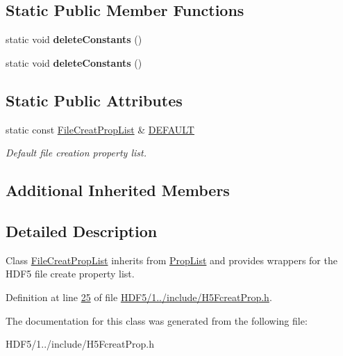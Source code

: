 \subsection*{Static Public Member Functions}
\begin{DoxyCompactItemize}
\item 
\mbox{\label{class_h5_1_1_file_creat_prop_list_acaf37fd4decdd710778cd89e2eff4d78}} 
static void {\bfseries delete\+Constants} ()
\item 
\mbox{\label{class_h5_1_1_file_creat_prop_list_acaf37fd4decdd710778cd89e2eff4d78}} 
static void {\bfseries delete\+Constants} ()
\end{DoxyCompactItemize}
\subsection*{Static Public Attributes}
\begin{DoxyCompactItemize}
\item 
\mbox{\label{class_h5_1_1_file_creat_prop_list_a4913710830a8ec38fbbda805074377d4}} 
static const \hyperlink{class_h5_1_1_file_creat_prop_list}{File\+Creat\+Prop\+List} \& \hyperlink{class_h5_1_1_file_creat_prop_list_a4913710830a8ec38fbbda805074377d4}{D\+E\+F\+A\+U\+LT}
\begin{DoxyCompactList}\small\item\em Default file creation property list. \end{DoxyCompactList}\end{DoxyCompactItemize}
\subsection*{Additional Inherited Members}


\subsection{Detailed Description}
Class \hyperlink{class_h5_1_1_file_creat_prop_list}{File\+Creat\+Prop\+List} inherits from \hyperlink{class_h5_1_1_prop_list}{Prop\+List} and provides wrappers for the H\+D\+F5 file create property list. 

Definition at line \hyperlink{_h_d_f5_21_810_81_2include_2_h5_fcreat_prop_8h_source_l00025}{25} of file \hyperlink{_h_d_f5_21_810_81_2include_2_h5_fcreat_prop_8h_source}{H\+D\+F5/1../include/\+H5\+Fcreat\+Prop.\+h}.



The documentation for this class was generated from the following file\+:\begin{DoxyCompactItemize}
\item 
H\+D\+F5/1../include/\+H5\+Fcreat\+Prop.\+h\end{DoxyCompactItemize}
